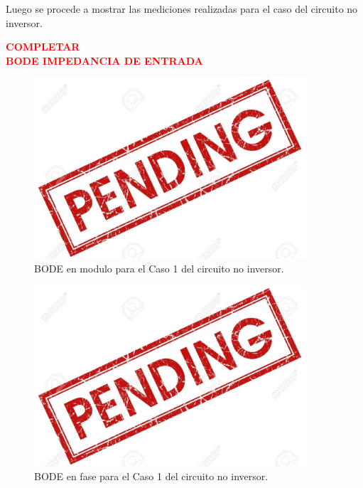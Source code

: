 Luego se procede a mostrar las mediciones realizadas para el caso del circuito no inversor.

\begin{center}
\textcolor{red}{\textbf{COMPLETAR}}\\
\textcolor{red}{\textbf{BODE IMPEDANCIA DE ENTRADA}}
\end{center}

\begin{figure}[H]	
	\centering
	\includegraphics[width=0.9\textwidth]{ImagenesAux/pend.jpg}
	\caption{BODE en modulo para el Caso 1 del circuito no inversor.}
	\label{fig:NoInvCompZinC1}
\end{figure} 

\begin{figure}[H]	
	\centering
	\includegraphics[width=0.9\textwidth]{ImagenesAux/pend.jpg}
	\caption{BODE en fase para el Caso 1 del circuito no inversor.}
	\label{fig:NoInvCompZinphC1}
\end{figure} 

